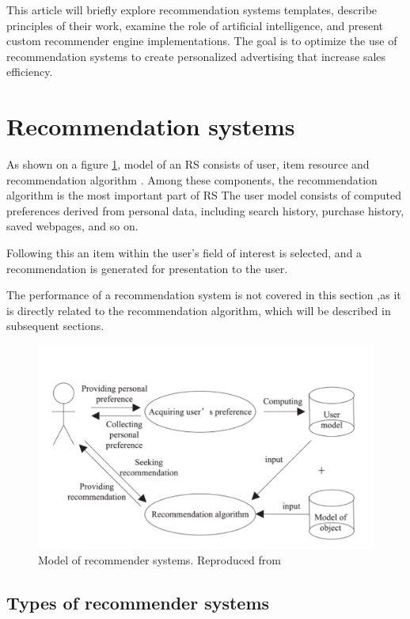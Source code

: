 \documentclass[10pt,twoside,english,a4paper]{article}
\begin{document}
\medskip This article will briefly explore recommendation systems templates, describe principles of their work, examine the role of artificial intelligence, and present custom recommender engine implementations. The goal is to optimize the use of recommendation systems to create personalized advertising that increase sales efficiency.

\section{Recommendation systems}

As shown on a figure \ref{fig:fig1}, model of an RS consists of user, item resource and recommendation algorithm \cite{8506344}. 
Among these components, the recommendation algorithm is the most important part of RS\cite{ren2012research}\cite{zhang2015research}
The user model consists of computed preferences derived from personal data, including search history, purchase history, saved webpages, and so on.

Following this an item within the user’s field of interest is selected, and a recommendation is generated for presentation to the user.

The performance of a recommendation system is not covered in this section ,as it is directly related to the recommendation algorithm, which will be described in subsequent sections.

\begin{figure}[H]
    \includegraphics[width=1\textwidth]{./diagrams/recommender_system_model.png}
    \caption{Model of recommender systems. Reproduced from \cite{8506344}}
    \label{fig:fig1}
\end{figure}


\subsection{Types of recommender systems}
\end{document}
